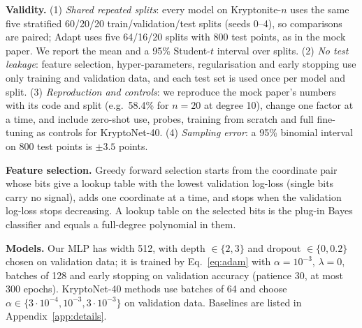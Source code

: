 \documentclass{article}
\theoremstyle{plain}
\begin{document}
\textbf{Validity.} (1) \emph{Shared repeated splits}: every model on Kryptonite-$n$ uses the same five stratified 60/20/20 train/validation/test splits (seeds 0--4), so comparisons are paired; Adapt uses five 64/16/20 splits with 800 test points, as in the mock paper. We report the mean and a 95\% Student-$t$ interval over splits. (2) \emph{No test leakage}: feature selection, hyper-parameters, regularisation and early stopping use only training and validation data, and each test set is used once per model and split. (3) \emph{Reproduction and controls}: we reproduce the mock paper's numbers with its code and split (e.g.\ 58.4\% for $n=20$ at degree 10), change one factor at a time, and include zero-shot use, probes, training from scratch and full fine-tuning as controls for KryptoNet-40. (4) \emph{Sampling error}: a 95\% binomial interval on 800 test points is $\pm3.5$ points.

\textbf{Feature selection.} Greedy forward selection starts from the coordinate pair whose bits give a lookup table with the lowest validation log-loss (single bits carry no signal), adds one coordinate at a time, and stops when the validation log-loss stops decreasing. A lookup table on the selected bits is the plug-in Bayes classifier and equals a full-degree polynomial in them.

\textbf{Models.} Our MLP has width 512, with depth $\in\{2,3\}$ and dropout $\in\{0,0.2\}$ chosen on validation data; it is trained by Eq.~\eqref{eq:adam} with $\alpha=10^{-3}$, $\lambda=0$, batches of 128 and early stopping on validation accuracy (patience 30, at most 300 epochs). KryptoNet-40 methods use batches of 64 and choose $\alpha\in\{3\cdot10^{-4},10^{-3},3\cdot10^{-3}\}$ on validation data. Baselines are listed in Appendix~\ref{app:details}.
\end{document}
